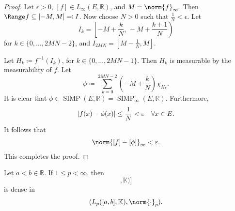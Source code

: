 \documentclass[notoc,notitlepage]{tufte-book}
\DeclareMathOperator{\SIMP}{SIMP}
\DeclareMathOperator{\STEP}{STEP}
\begin{document}
\begin{proof}
  \noindent
  Let $\epsilon > 0,\, [f] \in L_\infty(E, \mathbb{R})$,
  and $M = \norm{f}_\infty$.
  Then $\Range f \subseteq [-M, M] \eqqcolon I$.
  Now choose $N > 0$ such that $\frac{1}{N} < \epsilon$.
  Let
  \begin{equation*}
    I_k = \left[ -M + \frac{k}{N},\, -M + \frac{k+1}{N} \right)
  \end{equation*}
  for $k \in \{ 0, \ldots, 2MN - 2 \}$, and $I_{2MN} = \left[ M - \frac{1}{N}, M \right]$.

  Let $H_k \coloneqq f^{-1}(I_k)$, for $k \in \{ 0, \ldots, 2MN - 1 \}$.
  Then $H_k$ is measurable by the measurability of $f$.
  Let
  \begin{equation*}
    \phi \coloneqq \sum_{k=0}^{2MN-2} \left( -M + \frac{k}{N} \right) \chi_{H_k}.
  \end{equation*}
  It is clear that
  $\phi \in \SIMP(E, \mathbb{R}) = \SIMP_\infty(E, \mathbb{R})$.
  Furthermore,
  \begin{equation*}
    \left|f(x) - \phi(x)\right| \leq \frac{1}{N} < \varepsilon \quad \forall x \in E.
  \end{equation*}
  It follows that
  \begin{equation*}
    \norm{[f] - [\phi]}_\infty < \epsilon.
  \end{equation*}
  This completes the proof.
\end{proof}

\begin{propo}\label{propo:density_of_equivalence_classes_of_step_functions_in_l_p_spaces}
  Let $a < b \in \mathbb{R}$.
  If $1 \leq p < \infty$, then
  \begin{equation*}
    [\STEP([a, b], \mathbb{K})]
  \end{equation*}
  is dense in
  \begin{equation*}
    (L_p([a, b], \mathbb{K}), \norm{\cdot}_p).
  \end{equation*}
\end{propo}
\end{document}
